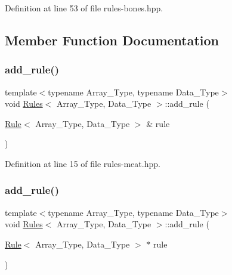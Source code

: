 Definition at line 53 of file rules-\/bones.\+hpp.



\subsection{Member Function Documentation}
\mbox{\label{class_rules_a60583152fddcb11178dcf3d02a924d7c}} 
\subsubsection{\texorpdfstring{add\+\_\+rule()}{add\_rule()}\hspace{0.1cm}{\footnotesize\ttfamily [1/3]}}
{\footnotesize\ttfamily template$<$typename Array\+\_\+\+Type, typename Data\+\_\+\+Type$>$ \\
void \hyperlink{class_rules}{Rules}$<$ Array\+\_\+\+Type, Data\+\_\+\+Type $>$\+::add\+\_\+rule (\begin{DoxyParamCaption}\item[{\hyperlink{class_rule}{Rule}$<$ Array\+\_\+\+Type, Data\+\_\+\+Type $>$ \&}]{rule }\end{DoxyParamCaption})\hspace{0.3cm}{\ttfamily [inline]}}



Definition at line 15 of file rules-\/meat.\+hpp.

\mbox{\label{class_rules_abd60b1d381ad0c8a772e4d81264bbe0a}} 
\subsubsection{\texorpdfstring{add\+\_\+rule()}{add\_rule()}\hspace{0.1cm}{\footnotesize\ttfamily [2/3]}}
{\footnotesize\ttfamily template$<$typename Array\+\_\+\+Type, typename Data\+\_\+\+Type$>$ \\
void \hyperlink{class_rules}{Rules}$<$ Array\+\_\+\+Type, Data\+\_\+\+Type $>$\+::add\+\_\+rule (\begin{DoxyParamCaption}\item[{\hyperlink{class_rule}{Rule}$<$ Array\+\_\+\+Type, Data\+\_\+\+Type $>$ $\ast$}]{rule }\end{DoxyParamCaption})\hspace{0.3cm}{\ttfamily [inline]}}



